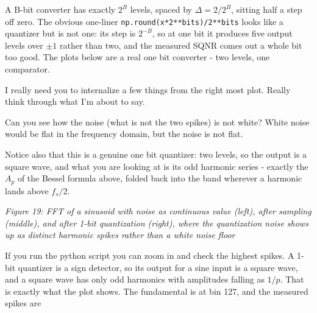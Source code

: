 \begin{Shaded}
\begin{Highlighting}[]
\OperatorTok{=} \OperatorTok{**}
\OperatorTok{=} \OperatorTok{/}
\OperatorTok{=}\OperatorTok{/}\OperatorTok{*}\OperatorTok{+}\OperatorTok{/}
    \OperatorTok{{-}} \OperatorTok{+}\OperatorTok{/}\NormalTok{, } \OperatorTok{{-}}\OperatorTok{/}\NormalTok{)}
\end{Highlighting}
\end{Shaded}

A B-bit converter has exactly \(2^B\) levels, spaced by
\(\Delta = 2/2^B\), sitting half a step off zero. The obvious one-liner
\texttt{np.round(x*2**bits)/2**bits} looks like a quantizer but is not
one: its step is \(2^{-B}\), so at one bit it produces five output
levels over \(\pm 1\) rather than two, and the measured SQNR comes out a
whole bit too good. The plots below are a real one bit converter - two
levels, one comparator.

I really need you to internalize a few things from the right most plot.
Really think through what I'm about to say.

Can you see how the noise (what is not the two spikes) is not white?
White noise would be flat in the frequency domain, but the noise is not
flat.

Notice also that this is a genuine one bit quantizer: two levels, so the
output is a square wave, and what you are looking at is its odd harmonic
series - exactly the \(A_p\) of the Bessel formula above, folded back
into the band wherever a harmonic lands above \(f_s/2\).


{
\centering
{}
}

\emph{Figure 19: FFT of a sinusoid with noise as continuous value
(left), after sampling (middle), and after 1-bit quantization (right),
where the quantization noise shows up as distinct harmonic spikes rather
than a white noise floor}

If you run the python script you can zoom in and check the highest
spikes. A 1-bit quantizer is a sign detector, so its output for a sine
input is a square wave, and a square wave has only odd harmonics with
amplitudes falling as \(1/p\). That is exactly what the plot shows. The
fundamental is at bin 127, and the measured spikes are

